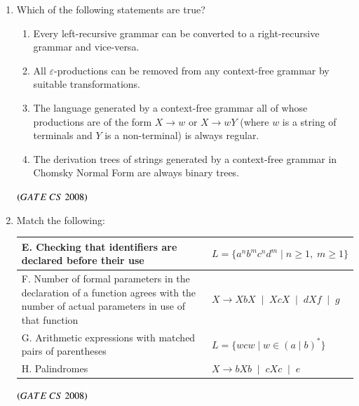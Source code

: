 \documentclass[journal]{IEEEtran}
\numberwithin{equation}{enumi}
\numberwithin{figure}{enumi}
\begin{document}
\begin{enumerate}
\item Which of the following statements are true?
\begin{enumerate}  
   \item Every left-recursive grammar can be converted to a right-recursive grammar and vice-versa.
   \item All $\varepsilon$-productions can be removed from any context-free grammar by suitable transformations.
   \item The language generated by a context-free grammar all of whose productions are of the form $X\to w$ or $X\to wY$ (where $w$ is a string of terminals and $Y$ is a non-terminal) is always regular.
   \item The derivation trees of strings generated by a context-free grammar in Chomsky Normal Form are always binary trees.
\end{enumerate}

 \begin{enumerate}
\end{enumerate}
\hfill $\left(GATE\ CS\  2008\right)$

\item Match the following:

\begin{tabular}{|p{5cm}|p{7cm}|}
\hline
E. Checking that identifiers are declared before their use 
& $L = \{ a^n b^m c^n d^m \mid n \geq 1,\; m \geq 1 \}$ \\
\hline
F. Number of formal parameters in the declaration of a function agrees with the number of actual parameters in use of that function 
& $X \rightarrow X b X \;\mid\; X c X \;\mid\; d X f \;\mid\; g$ \\
\hline
G. Arithmetic expressions with matched pairs of parentheses 
& $L = \{ w c w \mid w \in (a \mid b)^* \}$ \\
\hline
H. Palindromes 
& $X \rightarrow b X b \;\mid\; c X c \;\mid\; e$ \\
\hline
\end{tabular}

\begin{enumerate}
\end{enumerate}
\hfill $\left(GATE\ CS\  2008\right)$


\end{enumerate}
\end{document}
